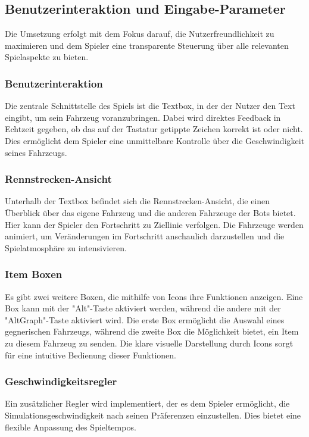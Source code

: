\documentclass[hidelinks,12pt]{article}
\begin{document}
\subsection{Benutzerinteraktion und Eingabe-Parameter}
Die Umsetzung erfolgt mit dem Fokus darauf, die Nutzerfreundlichkeit zu maximieren und dem Spieler eine transparente Steuerung über alle relevanten Spielaspekte zu bieten.

\subsubsection{Benutzerinteraktion}
Die zentrale Schnittstelle des Spiels ist die Textbox, in der der Nutzer den Text eingibt, um sein Fahrzeug voranzubringen. Dabei wird direktes Feedback in Echtzeit gegeben, ob das auf der Tastatur getippte Zeichen korrekt ist oder nicht. Dies ermöglicht dem Spieler eine unmittelbare Kontrolle über die Geschwindigkeit seines Fahrzeugs.

\subsubsection{Rennstrecken-Ansicht}
Unterhalb der Textbox befindet sich die Rennstrecken-Ansicht, die einen Überblick über das eigene Fahrzeug und die anderen Fahrzeuge der Bots bietet. Hier kann der Spieler den Fortschritt zu Ziellinie verfolgen. Die Fahrzeuge werden animiert, um Veränderungen im Fortschritt anschaulich darzustellen und die Spielatmosphäre zu intensivieren.

\subsubsection{Item Boxen}
Es gibt zwei weitere Boxen, die mithilfe von Icons ihre Funktionen anzeigen. Eine Box kann mit der "Alt"-Taste aktiviert werden, während die andere mit der "AltGraph"-Taste aktiviert wird. Die erste Box ermöglicht die Auswahl eines gegnerischen Fahrzeugs, während die zweite Box die Möglichkeit bietet, ein Item zu diesem Fahrzeug zu senden. Die klare visuelle Darstellung durch Icons sorgt für eine intuitive Bedienung dieser Funktionen.

\subsubsection{Geschwindigkeitsregler}
Ein zusätzlicher Regler wird implementiert, der es dem Spieler ermöglicht, die Simulationsgeschwindigkeit nach seinen Präferenzen einzustellen. Dies bietet eine flexible Anpassung des Spieltempos.
\end{document}
